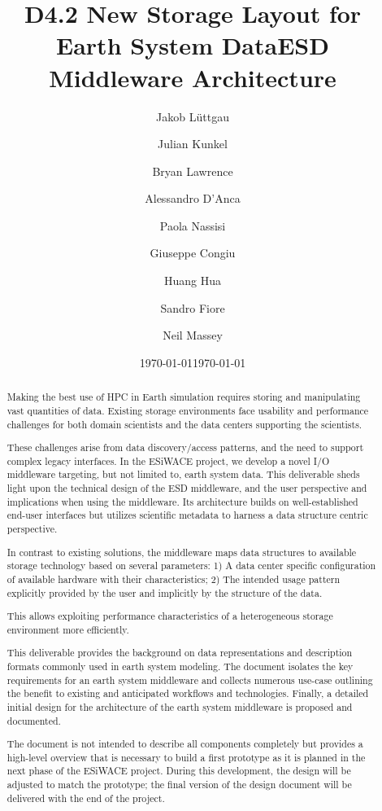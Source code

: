 \documentclass[a4paper,11pt]{esiwace-modified}
\title{D4.2 New Storage Layout for Earth System Data}
\author{Jakob Lüttgau
	\and Julian Kunkel
	\and Bryan Lawrence
	\and Alessandro D'Anca
	\and Paola Nassisi
	\and Giuseppe Congiu
	\and Huang Hua
	\and Sandro Fiore
	\and Neil Massey
}
\date{\today} %
\begin{document}
\title{ESD Middleware Architecture}
\date{\today}

\maketitle

\tableofcontents

\begin{abstract}
Making the best use of HPC in Earth simulation requires storing and manipulating vast quantities of data.
Existing storage environments face usability and performance challenges for both domain scientists and the data centers supporting the scientists.

These challenges arise from data discovery/access patterns, and the need to support complex legacy interfaces. In the ESiWACE project, we develop a novel I/O middleware targeting, but not limited to, earth system data.
This deliverable sheds light upon the technical design of the ESD middleware, and the user perspective and implications when using the middleware.
Its architecture builds on well-established end-user interfaces but utilizes scientific metadata to harness a data structure centric perspective.

In contrast to existing solutions, the middleware maps data structures to available storage technology based on several parameters:
1) A data center specific configuration of available hardware with their characteristics;
2) The intended usage pattern explicitly provided by the user and implicitly by the structure of the data.

This allows exploiting performance characteristics of a heterogeneous storage environment more efficiently.

This deliverable provides the background on data representations and description formats commonly used in earth system modeling.
The document isolates the key requirements for an earth system middleware and collects numerous use-case outlining the benefit to existing and anticipated workflows and technologies.
Finally, a detailed initial design for the architecture of the earth system middleware is proposed and documented.

The document is not intended to describe all components completely but provides a high-level overview that is necessary to build a first prototype as it is planned in the next phase of the ESiWACE project.
During this development, the design will be adjusted to match the prototype; the final version of the design document will be delivered with the end of the project.
\end{abstract}
\end{document}
